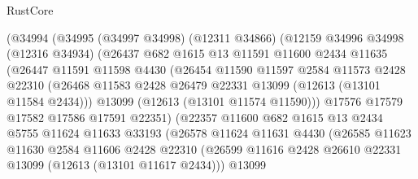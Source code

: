 \begin{lexlean}{RustCore}
\begin{coremodule}
                  (@34994
                    (@34995
                      (@34997 @34998)
                      (@12311 @34866)
                      (@12159
                        @34996
                        @34998
                        (@12316 @34934)
                        (@26437
                          @682
                          @1615
                          @13
                          @11591
                          @11600
                          @2434
                          @11635
                          (@26447
                            @11591
                            @11598
                            @4430
                            (@26454
                              @11590
                              @11597
                              @2584
                              @11573
                              @2428
                              @22310
                              (@26468
                                @11583
                                @2428
                                @26479
                                @22331
                                @13099
                                (@12613 (@13101 @11584 @2434)))
                              @13099
                              (@12613 (@13101 @11574 @11590)))
                            @17576
                            @17579
                            @17582
                            @17586
                            @17591
                            @22351)
                          (@22357
                            @11600
                            @682
                            @1615
                            @13
                            @2434
                            @5755
                            @11624
                            @11633
                            @33193
                            (@26578
                              @11624
                              @11631
                              @4430
                              (@26585
                                @11623
                                @11630
                                @2584
                                @11606
                                @2428
                                @22310
                                (@26599
                                  @11616
                                  @2428
                                  @26610
                                  @22331
                                  @13099
                                  (@12613 (@13101 @11617 @2434)))
                                @13099

\end{coremodule}
\end{lexlean}
